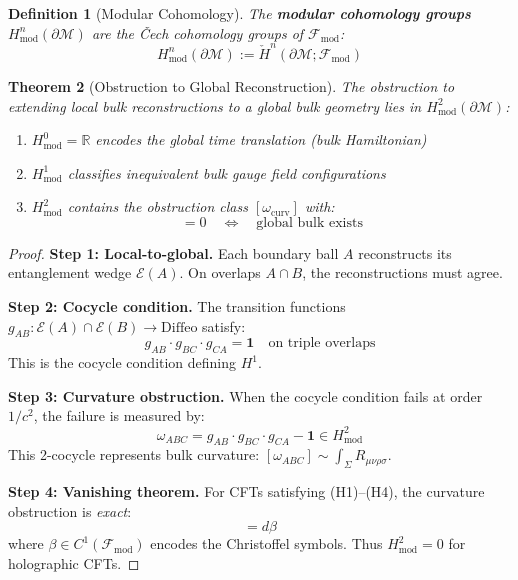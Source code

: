 \documentclass[12pt,a4paper]{article}
\newtheorem{theorem}{Theorem}[section]
\newtheorem{definition}[theorem]{Definition}
\begin{document}
\begin{definition}[Modular Cohomology]\label{def:modular-cohomology}
The \textbf{modular cohomology groups} $H^n_{\text{mod}}(\partial\mathcal{M})$ are the \v{C}ech cohomology groups of $\mathcal{F}_{\text{mod}}$:
\begin{equation}
H^n_{\text{mod}}(\partial\mathcal{M}) := \check{H}^n(\partial\mathcal{M}; \mathcal{F}_{\text{mod}})
\end{equation}
\end{definition}

\begin{theorem}[Obstruction to Global Reconstruction]\label{thm:modular-obstruction}
The obstruction to extending local bulk reconstructions to a global bulk geometry lies in $H^2_{\text{mod}}(\partial\mathcal{M})$:
\begin{enumerate}
    \item $H^0_{\text{mod}} = \mathbb{R}$ encodes the global time translation (bulk Hamiltonian)
    \item $H^1_{\text{mod}}$ classifies inequivalent bulk gauge field configurations
    \item $H^2_{\text{mod}}$ contains the obstruction class $[\omega_{\text{curv}}]$ with:
    \begin{equation}
    [\omega_{\text{curv}}] = 0 \quad \Longleftrightarrow \quad \text{global bulk exists}
    \end{equation}
\end{enumerate}
\end{theorem}

\begin{proof}
\textbf{Step 1: Local-to-global.} Each boundary ball $A$ reconstructs its entanglement wedge $\mathcal{E}(A)$. On overlaps $A \cap B$, the reconstructions must agree.

\textbf{Step 2: Cocycle condition.} The transition functions $g_{AB}: \mathcal{E}(A) \cap \mathcal{E}(B) \to \text{Diffeo}$ satisfy:
\begin{equation}
g_{AB} \cdot g_{BC} \cdot g_{CA} = \mathbf{1} \quad \text{on triple overlaps}
\end{equation}
This is the cocycle condition defining $H^1$.

\textbf{Step 3: Curvature obstruction.} When the cocycle condition fails at order $1/c^2$, the failure is measured by:
\begin{equation}
\omega_{ABC} = g_{AB} \cdot g_{BC} \cdot g_{CA} - \mathbf{1} \in H^2_{\text{mod}}
\end{equation}
This 2-cocycle represents bulk curvature: $[\omega_{ABC}] \sim \int_\Sigma R_{\mu\nu\rho\sigma}$.

\textbf{Step 4: Vanishing theorem.} For CFTs satisfying (H1)--(H4), the curvature obstruction is \emph{exact}:
\begin{equation}
[\omega_{\text{curv}}] = d\beta
\end{equation}
where $\beta \in C^1(\mathcal{F}_{\text{mod}})$ encodes the Christoffel symbols. Thus $H^2_{\text{mod}} = 0$ for holographic CFTs.
\end{proof}
\end{document}
